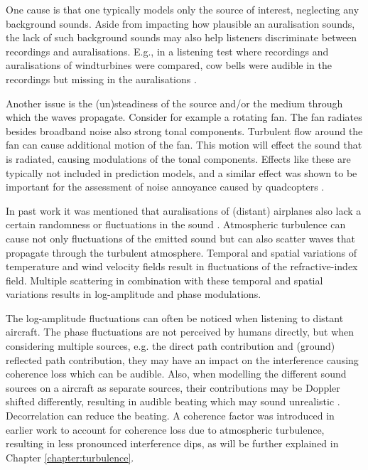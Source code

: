 One cause is that one typically models only the source of interest, neglecting
any background sounds. Aside from impacting how plausible an auralisation
sounds, the lack of such background sounds may also help listeners discriminate
between recordings and auralisations. E.g., in a listening test where recordings
and auralisations of windturbines were compared, cow bells were audible in the
recordings but missing in the auralisations \cite{Pieren2014}.

Another issue is the (un)steadiness of the source and/or
the medium through which the waves propagate. Consider for example a
rotating fan. The fan radiates besides broadband noise also strong tonal
components. Turbulent flow around the fan can cause additional motion of the
fan. This motion will effect the sound that is radiated, causing
modulations of the tonal components. Effects like these are typically not
included in prediction models, and a similar effect was shown to be
important for the assessment of noise annoyance caused by quadcopters
\cite{Rizzi2015}.

In past work it was mentioned that auralisations of (distant) airplanes also
lack a certain randomness or fluctuations in the sound \cite{Arntzen2014a}.
Atmospheric turbulence can cause not only fluctuations of the emitted sound but
can also scatter waves that propagate through the turbulent atmosphere. Temporal
and spatial variations of temperature and wind velocity fields result in
fluctuations of the refractive-index field. Multiple scattering in combination
with these temporal and spatial variations results in log-amplitude and phase
modulations.

The log-amplitude fluctuations can often be noticed when listening to distant
aircraft. The phase fluctuations are not perceived by humans directly, but when
considering multiple sources, e.g. the direct path contribution and (ground)
reflected path contribution, they may have an impact on the interference causing
coherence loss \cite{Daigle1979} which can be audible. Also, when modelling the
different sound sources on a aircraft as separate sources, their contributions
may be Doppler shifted differently, resulting in audible beating which may sound
unrealistic \cite{Rizzi2013}. Decorrelation can reduce the beating. A coherence
factor was introduced in earlier work \cite{Shin2006, Arntzen2014b,
Arntzen2014a} to account for coherence loss due to atmospheric turbulence,
resulting in less pronounced interference dips, as will be further explained in
Chapter \ref{chapter:turbulence}.

